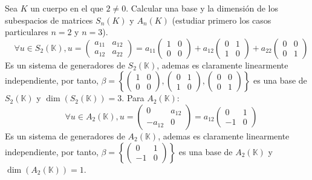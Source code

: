 \begin{ejercicio} Sea \( K \) un cuerpo en el que \( 2 \neq 0 \). Calcular una base y la dimensión de los subespacios de matrices \( S_n(K) \) y \( A_n(K) \) (estudiar primero los casos particulares \( n = 2 \) y \( n = 3 \)).
	\begin{equation*}
		\quad \forall u \in S_2(\mathbb{K}), u = \begin{pmatrix}
			a_{11} & a_{12} \\
			a_{12} & a_{22}
		\end{pmatrix} = a_{11} \begin{pmatrix}
			1 & 0 \\
			0 & 0
		\end{pmatrix} + a_{12} \begin{pmatrix}
			0 & 1 \\
			1 & 0
		\end{pmatrix} + a_{22} \begin{pmatrix}
			0 & 0 \\
			0 & 1
		\end{pmatrix}
	\end{equation*}
	Es un sistema de generadores de $S_2(\mathbb{K})$, ademas es claramente linearmente independiente, por tanto, $\beta = \left\{ \begin{pmatrix}
			1 & 0 \\
			0 & 0
		\end{pmatrix}, \begin{pmatrix}
			0 & 1 \\
			1 & 0
		\end{pmatrix}, \begin{pmatrix}
			0 & 0 \\
			0 & 1
		\end{pmatrix} \right\}$ es una base de $S_2(\mathbb{K})$ y $\dim(S_2(\mathbb{K})) = 3$.
	Para $A_2(\mathbb{K})$:
	\begin{equation*}
		\quad \forall u \in A_2(\mathbb{K}), u = \begin{pmatrix}
			0       & a_{12} \\
			-a_{12} & 0
		\end{pmatrix} = a_{12} \begin{pmatrix}
			0  & 1 \\
			-1 & 0
		\end{pmatrix}
	\end{equation*}
	Es un sistema de generadores de $A_2(\mathbb{K})$, ademas es claramente linearmente independiente, por tanto, $\beta = \left\{ \begin{pmatrix}
			0  & 1 \\
			-1 & 0
		\end{pmatrix} \right\}$ es una base de $A_2(\mathbb{K})$ y $\dim(A_2(\mathbb{K})) = 1$.


\end{ejercicio}
